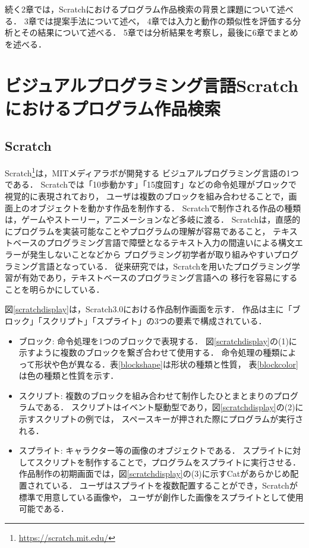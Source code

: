 \documentclass[11pt]{jreport}
\begin{document}
続く2章では，Scratchにおけるプログラム作品検索の背景と課題について述べる．
3章では提案手法について述べ，
4章では入力と動作の類似性を評価する分析とその結果について述べる．
5章では分析結果を考察し，最後に6章でまとめを述べる．


\chapter{ビジュアルプログラミング言語Scratchにおけるプログラム作品検索}

\section{Scratch}
\label{scratchsetumei}
Scratch\footnote{ \url{https://scratch.mit.edu/}}は，MITメディアラボが開発する
ビジュアルプログラミング言語の1つである．
Scratchでは「10歩動かす」「15度回す」などの命令処理がブロックで視覚的に表現されており，
ユーザは複数のブロックを組み合わせることで，画面上のオブジェクトを動かす作品を制作する．
Scratchで制作される作品の種類は，ゲームやストーリー，アニメーションなど多岐に渡る\cite{wild}．
Scratchは，直感的にプログラムを実装可能なことやプログラムの理解が容易であること，
テキストベースのプログラミング言語で障壁となるテキスト入力の間違いによる構文エラーが発生しないことなどから
プログラミング初学者が取り組みやすいプログラミング言語となっている．
従来研究では，Scratchを用いたプログラミング学習が有効であり，テキストベースのプログラミング言語への
移行を容易にすることを明らかにしている\cite{blocktotext}\cite{blockandbeyond}．

図\ref{scratchdisplay}は，Scratch3.0における作品制作画面を示す．
作品は主に「ブロック」「スクリプト」「スプライト」の3つの要素で構成されている．

\begin{itemize}
    \item ブロック: 命令処理を1つのブロックで表現する．
    図\ref{scratchdisplay}の(1)に示すように複数のブロックを繋ぎ合わせて使用する．
    命令処理の種類によって形状や色が異なる．表\ref{blockshape}は形状の種類と性質，
    表\ref{blockcolor}は色の種類と性質を示す．
    \item スクリプト: 複数のブロックを組み合わせて制作したひとまとまりのプログラムである．
    スクリプトはイベント駆動型であり，図\ref{scratchdisplay}の(2)に示すスクリプトの例では，
    スペースキーが押された際にプログラムが実行される．
    \item スプライト: キャラクター等の画像のオブジェクトである．
    スプライトに対してスクリプトを制作することで，プログラムをスプライトに実行させる．
    作品制作の初期画面では，図\ref{scratchdisplay}の(3)に示すCatがあらかじめ配置されている．
    ユーザはスプライトを複数配置することができ，Scratchが標準で用意している画像や，
    ユーザが創作した画像をスプライトとして使用可能である．
\end{itemize}
\end{document}
